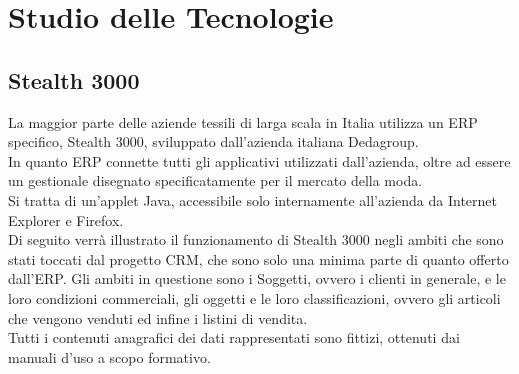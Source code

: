 \section{Studio delle Tecnologie}
\subsection{Stealth 3000}
La maggior parte delle aziende tessili di larga scala in Italia utilizza un ERP specifico, Stealth 3000, sviluppato dall'azienda italiana Dedagroup.\\
In quanto ERP connette tutti gli applicativi utilizzati dall'azienda, oltre ad essere un gestionale disegnato specificatamente per il mercato della moda. \\
Si tratta di un'applet Java, accessibile solo internamente all'azienda da Internet Explorer e Firefox.\\
Di seguito verrà illustrato il funzionamento di Stealth 3000 negli ambiti che sono stati toccati dal progetto CRM, che sono solo una minima parte di quanto offerto dall'ERP. Gli ambiti in questione sono i Soggetti, ovvero i clienti in generale, e le loro condizioni commerciali, gli oggetti e le loro classificazioni, ovvero gli articoli che vengono venduti ed infine i listini di vendita.\\
Tutti i contenuti anagrafici dei dati rappresentati sono fittizi, ottenuti dai manuali d'uso a scopo formativo.

